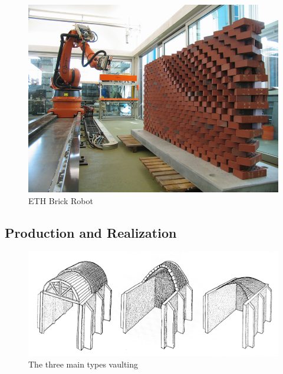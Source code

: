 \begin{figure}[H]
\centering
\includegraphics[width=0.9\linewidth ]{figure/Introduction/RobotBrick.jpg}
\caption{ETH Brick Robot}
\end{figure}



\subsection{Production and Realization}
\begin{figure}[H]
\centering
\includegraphics[width=0.9\linewidth ]{figure/Introduction/vaulting2.pdf}
\caption{The three main types vaulting}
\end{figure}

